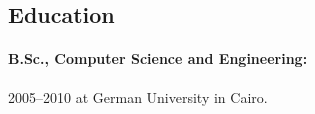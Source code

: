 \subsection{
Education
}
\paragraph{
B.Sc., Computer Science and Engineering:
}
2005--2010 at German University in Cairo.
